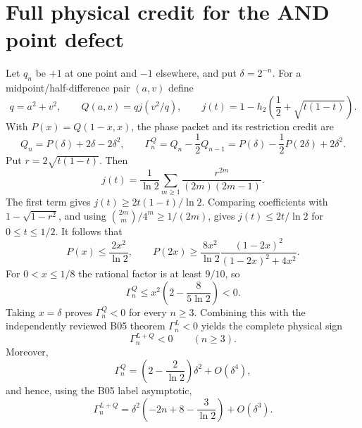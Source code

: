 \section*{Full physical credit for the AND point defect}

Let $q_n$ be $+1$ at one point and $-1$ elsewhere, and put
$\delta=2^{-n}$.  For a midpoint/half-difference pair $(a,v)$ define
\[
 q=a^2+v^2,\qquad
 Q(a,v)=qj(v^2/q),\qquad
 j(t)=1-h_2\!\left(\frac12+\sqrt{t(1-t)}\right).
\]
With $P(x)=Q(1-x,x)$, the phase packet and its restriction credit are
\[
 Q_n=P(\delta)+2\delta-2\delta^2,
 \qquad
 \Gamma_n^Q=Q_n-\frac12Q_{n-1}
 =P(\delta)-\frac12P(2\delta)+2\delta^2.
\]
Put $r=2\sqrt{t(1-t)}$.  Then
\[
 j(t)=\frac1{\ln2}\sum_{m\ge1}
 \frac{r^{2m}}{(2m)(2m-1)}.
\]
The first term gives $j(t)\ge2t(1-t)/\ln2$.  Comparing coefficients
with $1-\sqrt{1-r^2}$, and using
$\binom{2m}{m}/4^m\ge1/(2m)$, gives
$j(t)\le2t/\ln2$ for $0\le t\le1/2$.  It follows that
\[
 P(x)\le\frac{2x^2}{\ln2},\qquad
 P(2x)\ge\frac{8x^2}{\ln2}
 \frac{(1-2x)^2}{(1-2x)^2+4x^2}.
\]
For $0<x\le1/8$ the rational factor is at least $9/10$, so
\[
 \Gamma_n^Q\le x^2\left(2-\frac8{5\ln2}\right)<0.
\]
Taking $x=\delta$ proves $\Gamma_n^Q<0$ for every $n\ge3$.
Combining this with the independently reviewed B05 theorem
$\Gamma_n^L<0$ yields the complete physical sign
\[
 \Gamma_n^{L+Q}<0\qquad(n\ge3).
\]
Moreover,
\[
 \Gamma_n^Q=\left(2-\frac2{\ln2}\right)\delta^2+O(\delta^4),
\]
and hence, using the B05 label asymptotic,
\[
 \Gamma_n^{L+Q}
 =\delta^2\left(-2n+8-\frac3{\ln2}\right)+O(\delta^3).
\]

